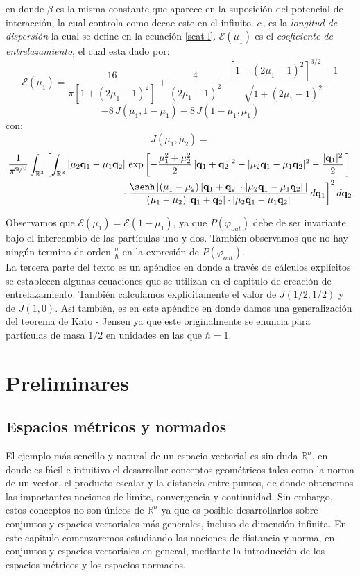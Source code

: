 \documentclass[12pt]{book}
\numberwithin{equation}{chapter}
\def\q{\mathbf{q}}
\def\R{\mathbb{R}}
\def\E{\mathcal{E}}
\begin{document}
en donde $\beta$ es la misma constante que aparece en la suposici\'on del potencial de interacci\'on, la cual controla como decae este en el infinito. $c_{0}$ es la \emph{longitud de dispersi\'on} la cual se define en la ecuaci\'on \eqref{scat-l}. $\E(\mu_{1})$ es el  \emph{coeficiente de entrelazamiento}, el cual esta dado por:
$$ \E(\mu_{1})= \frac{16}{\pi [1+(2\mu_{1}-1)^{2}]} + \frac{4}{(2\mu_{1}-1)^{2}} \cdot \frac{[1+(2\mu_{1}-1)^{2}]^{3/2} - 1}{\sqrt{1+(2\mu_{1}-1)^{2}}} $$
$$ - 8\, J(\mu_{1},1-\mu_{1}) - 8 \, J(1-\mu_{1},\mu_{1}) $$
con:
$$J(\mu_{1},\mu_{2})= $$
\begin{align}
\frac{1}{\pi^{9/2}} \int_{\R^{3}} \left[ \int_{\R^{3}}
|\mu_{2}\q_{1}-\mu_{1}\q_{2}|\, \exp \left[ -\frac{\mu_{1}^{2}+\mu_{2}^{2}}{2}\, |\q_{1}+\q_{2}|^{2} - |\mu_{2}\q_{1}-\mu_{1}\q_{2}|^{2}-\frac{|\q_{1}|^{2}}{2}\, \right]
\right.
\nonumber\\
\qquad \left. \vphantom{\int_{\R^{2}}}
\cdot \frac{ \senh \left[ (\mu_{1}-\mu_{2})\, |\q_{1}+\q_{2}|\cdot |\mu_{2}\q_{1}-\mu_{1}\q_{2}| \, \right]}{ (\mu_{1}-\mu_{2})\, |\q_{1}+\q_{2}|\cdot |\mu_{2}\q_{1}-\mu_{1}\q_{2}| }
\,d\q_{1} \right]^{2} d\q_{2} \nonumber
\end{align}

Observamos que $\E(\mu_{1})=\E(1-\mu_{1})$, ya que $P( \varphi_{out} )$ debe de ser invariante bajo el intercambio de las part\'iculas uno y dos. Tambi\'en observamos que no hay ning\'un termino de orden $\frac{\sigma}{\hbar}$ en la expresi\'on de $P(\varphi_{out})$.\\

La tercera parte del texto es un ap\'endice en donde a trav\'es de c\'alculos expl\'icitos se establecen algunas ecuaciones que se utilizan en el capitulo de creaci\'on de entrelazamiento. Tambi\'en calculamos expl\'icitamente el valor de $J(1/2 , 1/2)$ y de $J(1,0)$.
As\'i tambi\'en, es en este ap\'endice en donde damos una generalizaci\'on del teorema de Kato - Jensen ya que este originalmente se enuncia para part\'iculas de masa $1/2$ en unidades en las que $\hbar=1$.


\part{Preliminares}

\chapter{Espacios m\'etricos y normados}
El ejemplo m\'as sencillo y natural de un espacio vectorial es sin duda $\R^{n}$, en donde es f\'acil e intuitivo el desarrollar conceptos geom\'etricos tales como la norma de un vector, el producto escalar  y la distancia entre puntos, de donde obtenemos las importantes nociones de limite, convergencia y continuidad. Sin embargo, estos conceptos no son \'unicos de $\R^{n}$ ya que es posible desarrollarlos sobre conjuntos y espacios vectoriales m\'as generales, incluso de dimensi\'on infinita.  En este capitulo comenzaremos estudiando las nociones de distancia y norma, en conjuntos y espacios vectoriales en general, mediante la introducci\'on de los espacios m\'etricos y los espacios normados.    
\end{document}
